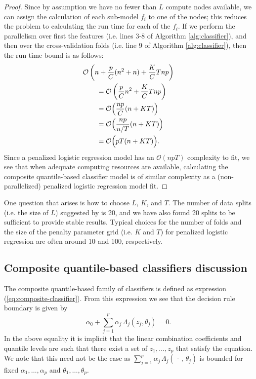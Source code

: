 \begin{proof}
  Since by assumption we have no fewer than $L$ compute nodes available, we can
  assign the calculation of each sub-model $f_i$ to one of the nodes; this
  reduces the problem to calculating the run time for each of the $f_i$.  If we
  perform the parallelism over first the features (i.e. lines 3-8 of Algorithm
  \ref{alg:classifier}), and then over the cross-validation folds (i.e. line 9
  of Algorithm \ref{alg:classifier}), then the run time bound is as follows:
  \begin{align}
    \label{eq:classifier-runtime-parallel}
    \begin{split} \MoveEqLeft
      \mathcal{O}\left( n + \frac{p}{C} (n^2 + n) + \frac{K}{C} Tnp \right) \\
      &= \mathcal{O}\left( \frac{p}{C} n^2 + \frac{K}{C} Tnp \right) \\
      &= \mathcal{O}\Big( \frac{np}{C} (n + KT) \Big) \\
      &= \mathcal{O}\Big( \frac{np}{n/T} (n + KT) \Big) \\
      &= \mathcal{O}\Big( pT (n + KT) \Big).
    \end{split}
  \end{align}
  Since a penalized logistic regression model has an $\mathcal{O}(npT)$
  complexity to fit, we see that when adequate computing resources are
  available, calculating the composite quantile-based classifier model is of
  similar complexity as a (non-parallelized) penalized logistic regression model
  fit.
\end{proof}

One question that arises is how to choose $L$, $K$, and $T$.  The number of data
splits (i.e. the size of $L$) suggested by \cite{fan2016} is 20, and we have
also found 20 splits to be sufficient to provide stable results.  Typical
choices for the number of folds and the size of the penalty parameter grid
(i.e. $K$ and $T$) for penalized logistic regression are often around 10 and
100, respectively.




\subsection{Composite quantile-based classifiers discussion}
\label{sec:classifier-discussion}

The composite quantile-based family of classifiers is defined as expression
(\ref{eq:composite-classifier}).  From this expression we see that the decision
rule boundary is given by
\begin{equation}
  \label{eq:composite-classifiers-boundary}
  \alpha_0 + \sum_{j=1}^p \alpha_j\, \Lambda_j (z_j, \theta_j) = 0.
\end{equation}
In the above equality it is implicit that the linear combination coefficients
and quantile levels are such that there exist a set of $z_1, \dots, z_p$ that
satisfy the equation.  We note that this need not be the case as
$\sum_{j=1}^p \alpha_j\, \Lambda_j (\,\cdot\,, \,\theta_j)$ is bounded for fixed
$\alpha_1, \dots, \alpha_p$ and $\theta_1, \dots, \theta_p$.

